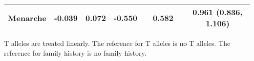 \documentclass{standalone}
\begin{document}
\begin{threeparttable}
\begin{tabular}{@{}lccccccc@{}}
  Menarche & -0.039 & 0.072 & -0.550 && 0.582 && 0.961 (0.836, 1.106) \\
   \bottomrule
\end{tabular}
\captionsetup{justification   = raggedright,
              singlelinecheck = false}
\caption*{T alleles are treated linearly. The reference for T alleles is no T alleles. The reference for family history is no family history.}
\end{threeparttable}
\end{document}
